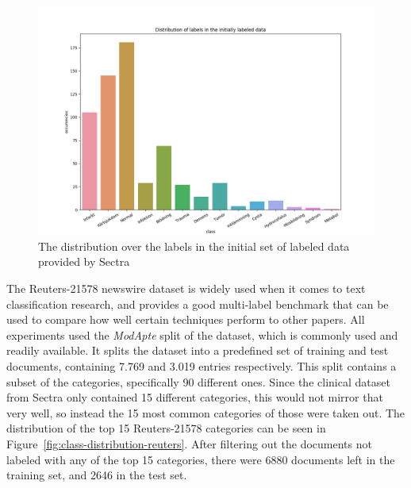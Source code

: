 \begin{figure}
    \includegraphics[scale=0.5]{figures/class-distribution.png}
    \caption{The distribution over the labels in the initial set of labeled data provided by Sectra}
    \label{fig:class-distribution}
\end{figure}

The Reuters-21578 newswire dataset is widely used when it comes to text classification research, and provides a good multi-label benchmark that can be used to compare how well certain techniques perform to other papers.
All experiments used the \textit{ModApte} split of the dataset, which is commonly used and readily available. %
It splits the dataset into a predefined set of training and test documents, containing 7.769 and 3.019 entries respectively.
This split contains a subset of the categories, specifically 90 different ones.
Since the clinical dataset from Sectra only contained 15 different categories, this would not mirror that very well, so instead the 15 most common categories of those were taken out.
The distribution of the top 15 Reuters-21578 categories can be seen in Figure~\ref{fig:class-distribution-reuters}.
After filtering out the documents not labeled with any of the top 15 categories, there were 6880 documents left in the training set, and 2646 in the test set.

